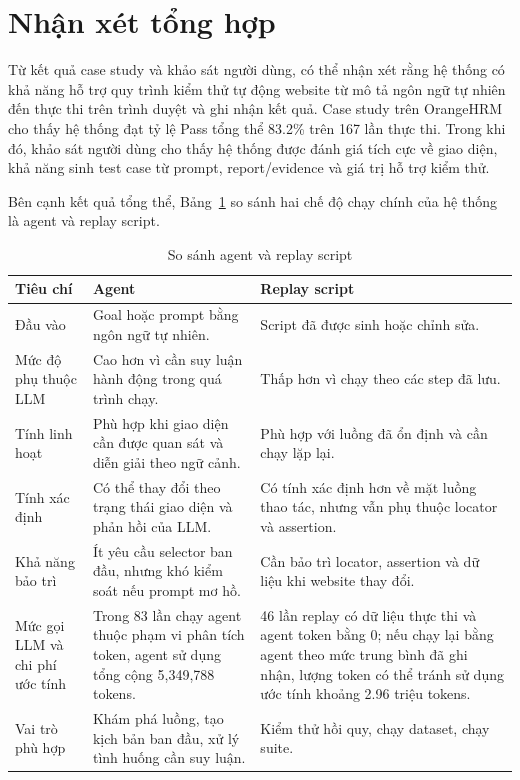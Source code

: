 \section{Nhận xét tổng hợp}

Từ kết quả case study và khảo sát người dùng, có thể nhận xét rằng hệ thống có khả năng hỗ trợ quy trình kiểm thử tự động website từ mô tả ngôn ngữ tự nhiên đến thực thi trên trình duyệt và ghi nhận kết quả. Case study trên OrangeHRM cho thấy hệ thống đạt tỷ lệ Pass tổng thể 83.2\% trên 167 lần thực thi. Trong khi đó, khảo sát người dùng cho thấy hệ thống được đánh giá tích cực về giao diện, khả năng sinh test case từ prompt, report/evidence và giá trị hỗ trợ kiểm thử.

Bên cạnh kết quả tổng thể, Bảng~\ref{tab:chapter6_agent_replay_comparison} so sánh hai chế độ chạy chính của hệ thống là agent và replay script.

\begin{table}[H]
\centering
\caption{So sánh agent và replay script}
\label{tab:chapter6_agent_replay_comparison}
\renewcommand{\arraystretch}{1.2}
\begin{tabular}{|p{3.6cm}|p{5.2cm}|p{5.2cm}|}
\hline
\textbf{Tiêu chí} & \textbf{Agent} & \textbf{Replay script} \\
\hline
Đầu vào & Goal hoặc prompt bằng ngôn ngữ tự nhiên. & Script đã được sinh hoặc chỉnh sửa. \\
\hline
Mức độ phụ thuộc LLM & Cao hơn vì cần suy luận hành động trong quá trình chạy. & Thấp hơn vì chạy theo các step đã lưu. \\
\hline
Tính linh hoạt & Phù hợp khi giao diện cần được quan sát và diễn giải theo ngữ cảnh. & Phù hợp với luồng đã ổn định và cần chạy lặp lại. \\
\hline
Tính xác định & Có thể thay đổi theo trạng thái giao diện và phản hồi của LLM. & Có tính xác định hơn về mặt luồng thao tác, nhưng vẫn phụ thuộc locator và assertion. \\
\hline
Khả năng bảo trì & Ít yêu cầu selector ban đầu, nhưng khó kiểm soát nếu prompt mơ hồ. & Cần bảo trì locator, assertion và dữ liệu khi website thay đổi. \\
\hline
Mức gọi LLM và chi phí ước tính & Trong 83 lần chạy agent thuộc phạm vi phân tích token, agent sử dụng tổng cộng 5,349,788 tokens. & 46 lần replay có dữ liệu thực thi và agent token bằng 0; nếu chạy lại bằng agent theo mức trung bình đã ghi nhận, lượng token có thể tránh sử dụng ước tính khoảng 2.96 triệu tokens. \\
\hline
Vai trò phù hợp & Khám phá luồng, tạo kịch bản ban đầu, xử lý tình huống cần suy luận. & Kiểm thử hồi quy, chạy dataset, chạy suite. \\
\hline
\end{tabular}
\end{table}

